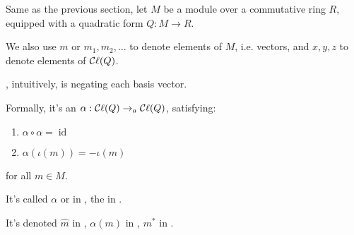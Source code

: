 Same as the previous section, let $M$ be a module over a commutative ring $R$, equipped with a quadratic form $Q: M \to R$.

We also use $m$ or $m_1, m_2, \dots$ to denote elements of $M$, i.e. vectors, and $x, y, z$ to denote elements of $\mathop{\mathcal{C}\ell}(Q)$.

\begin{definition}
    \label{involute}
    \leanok

    , intuitively, is negating each basis vector.

    Formally, it's an  $\alpha : \mathop{\mathcal{C}\ell}(Q) \to_{a} \mathop{\mathcal{C}\ell}(Q)$, satisfying:

    \begin{enumerate}

    \item $\alpha \circ \alpha = \operatorname{id}$
    
    \item $\alpha(\iota(m)) = - \iota(m)$
    
    \end{enumerate}

    for all $m \in M$.

    It's called  $\alpha$ or  in \cite{jadczyk2019notes}, 
    the  in \cite{gallier2008clifford}.

    It's denoted $\hat{m}$ in \cite{lounesto2001clifford}, $\alpha(m)$ in \cite{jadczyk2019notes}, $m^*$ in \cite{chisolm2012geometric}.

    \begin{figure}[H]
    \centering
    \end{figure}

\end{definition}

